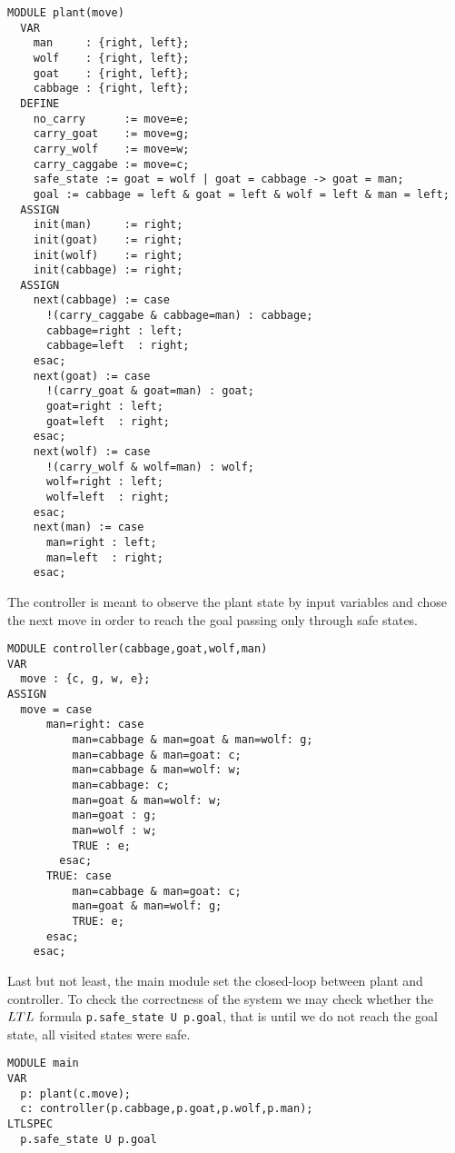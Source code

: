 \begin{lstlisting}[language=smv, caption=Ferryman example: plant module]
MODULE plant(move)
  VAR
    man     : {right, left};
    wolf    : {right, left};
    goat    : {right, left};
    cabbage : {right, left};
  DEFINE
    no_carry      := move=e;
    carry_goat    := move=g;
    carry_wolf    := move=w;
    carry_caggabe := move=c;
    safe_state := goat = wolf | goat = cabbage -> goat = man;
    goal := cabbage = left & goat = left & wolf = left & man = left;
  ASSIGN
    init(man)     := right;
    init(goat)    := right;
    init(wolf)    := right;
    init(cabbage) := right;
  ASSIGN
    next(cabbage) := case
      !(carry_caggabe & cabbage=man) : cabbage;
      cabbage=right : left;
      cabbage=left  : right;
    esac;
    next(goat) := case
      !(carry_goat & goat=man) : goat;
      goat=right : left;
      goat=left  : right;
    esac;
    next(wolf) := case
      !(carry_wolf & wolf=man) : wolf;
      wolf=right : left;
      wolf=left  : right;
    esac;
    next(man) := case
      man=right : left;
      man=left  : right;
    esac;
\end{lstlisting}

The controller is meant to observe the plant state by input variables and chose the next move in order to reach the goal passing only through safe states.
\begin{lstlisting}[language=smv, caption=Ferryman example: controller module]
MODULE controller(cabbage,goat,wolf,man)
VAR
  move : {c, g, w, e};
ASSIGN
  move = case
      man=right: case
          man=cabbage & man=goat & man=wolf: g;
          man=cabbage & man=goat: c;
          man=cabbage & man=wolf: w;
          man=cabbage: c;
          man=goat & man=wolf: w;
          man=goat : g;
          man=wolf : w;
          TRUE : e;
        esac;
      TRUE: case
          man=cabbage & man=goat: c;
          man=goat & man=wolf: g;
          TRUE: e;
      esac;
    esac;
\end{lstlisting}

Last but not least, the main module set the closed-loop between plant and controller.
To check the correctness of the system we may check whether the $LTL$ formula \lstinline{p.safe_state U p.goal}, that is until we do not reach the goal state, all visited states were safe. 

\begin{lstlisting}[language=smv, caption=Ferryman example: main module]
MODULE main
VAR
  p: plant(c.move);
  c: controller(p.cabbage,p.goat,p.wolf,p.man);
LTLSPEC
  p.safe_state U p.goal
\end{lstlisting}
